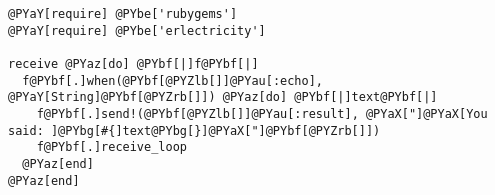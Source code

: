 \begin{Verbatim}[commandchars=@\[\]]
@PYaY[require] @PYbe['rubygems']
@PYaY[require] @PYbe['erlectricity']

receive @PYaz[do] @PYbf[|]f@PYbf[|]
  f@PYbf[.]when(@PYbf[@PYZlb[]]@PYau[:echo], @PYaY[String]@PYbf[@PYZrb[]]) @PYaz[do] @PYbf[|]text@PYbf[|]
    f@PYbf[.]send!(@PYbf[@PYZlb[]]@PYau[:result], @PYaX["]@PYaX[You said: ]@PYbg[#{]text@PYbg[}]@PYaX["]@PYbf[@PYZrb[]])
    f@PYbf[.]receive_loop
  @PYaz[end]
@PYaz[end]
\end{Verbatim}

